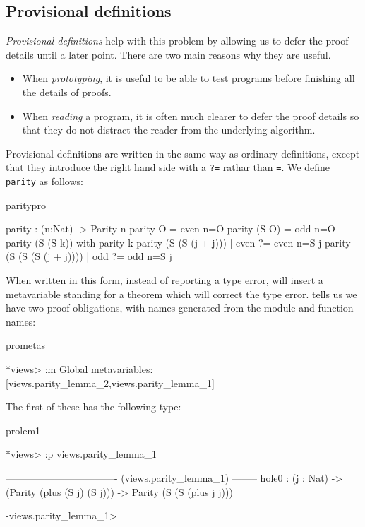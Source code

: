 \subsection{Provisional definitions}

\emph{Provisional definitions} help with this problem by allowing us to defer the
proof details until a later point. There are two main reasons why they are
useful.

\begin{itemize}
\item When \emph{prototyping}, it is useful to be able to test programs before
finishing all the details of proofs.  
\item When \emph{reading} a program, it is often much clearer to defer the proof
details so that they do not distract the reader from the underlying algorithm.
\end{itemize}

\noindent
Provisional definitions are written in the same way as ordinary definitions,
except that they introduce the right hand side with a \texttt{?=} rathar than
\texttt{=}. We define
\texttt{parity} as follows:

\begin{SaveVerbatim}{paritypro}

parity : (n:Nat) -> Parity n
parity O     = even {n=O}
parity (S O) = odd {n=O}
parity (S (S k)) with parity k {
  parity (S (S (j + j)))     | even ?= even {n=S j}
  parity (S (S (S (j + j)))) | odd  ?= odd {n=S j}
}

\end{SaveVerbatim}

\noindent
When written in this form, instead of reporting a type error, \Idris{} will insert
a metavariable standing for a theorem which will correct the type error. \Idris{} 
tells us we have two proof obligations, with names generated from the module and
function names:

\begin{SaveVerbatim}{prometas}

*views> :m 
Global metavariables:
        [views.parity_lemma_2,views.parity_lemma_1]

\end{SaveVerbatim}

\noindent
The first of these has the following type:

\begin{SaveVerbatim}{prolem1}

*views> :p views.parity_lemma_1 

---------------------------------- (views.parity_lemma_1) --------
{hole0} : (j : Nat) -> (Parity (plus (S j) (S j))) -> Parity (S (S (plus j j)))

-views.parity_lemma_1>  

\end{SaveVerbatim}

